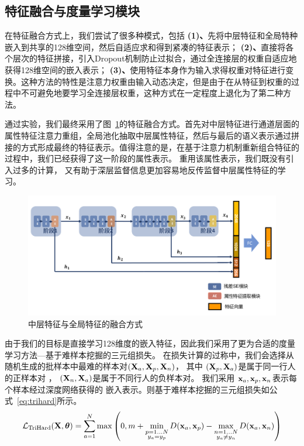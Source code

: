 
\subsection{特征融合与度量学习模块}

在特征融合方式上，我们尝试了很多种模式，包括
\textbf{(1)、}先将中层特征和全局特种嵌入到共享的128维空间，然后自适应求和得到紧凑的特征表示；
\textbf{(2)、}直接将各个层次的特征拼接，引入Dropout机制防止过拟合，通过全连接层的权重自适应地获得128维空间的嵌入表示；
\textbf{(3)、}使用特征本身作为输入求得权重对特征进行变换。这种方法的特性是注意力权重由输入动态决定，但是由于在从特征到权重的过程中不可避免地要学习全连接层权重，这种方式在一定程度上退化为了第二种方法。

通过实验，我们最终采用了图~\ref{fig:fusion}的特征融合方式。首先对中层特征进行通道层面的属性特征注意力重组，全局池化抽取中层属性特征，然后与最后的语义表示通过拼接的方式形成最终的特征表示。值得注意的是，在基于注意力机制重新组合特征的过程中，我们已经获得了这一阶段的属性表示。
重用该属性表示，我们既没有引入过多的计算，
又有助于深层监督信息更加容易地反传监督中层属性特征的学习。

\begin{figure}
	\centering
	\includegraphics[width=.9\textwidth]{fig/2018-05-11-16-54-07.png}
	\caption{中层特征与全局特征的融合方式}
	\label{fig:fusion}
\end{figure}

由于我们的目标是直接学习128维度的嵌入特征，因此我们采用了更为合适的度量学习方法---基于难样本挖掘的三元组损失\cite{hermans2017defense}。
在损失计算的过称中，我们会选择从随机生成的批样本中最难的样本对$({\mathbf{X}}_a, {\mathbf{X}}_p, {\mathbf{X}}_n)$，
其中 $({\mathbf{X}}_p, {\mathbf{X}}_a)$是属于同一行人的正样本对
， $({\mathbf{X}}_n, {\mathbf{X}}_a)$是属于不同行人的负样本对。
我们采用 ${\mathbf{x}}_a, {\mathbf{x}}_p, {\mathbf{x}}_n$表示每个样本经过深度网络获得的
嵌入表示。则基于难样本挖掘的三元组损失如公式~\ref{eq:trihard}所示。
\begin{equation}
	\mathcal{L}_{\textrm{TriHard}} ({\mathbf{X}}, {\boldsymbol{\theta}}) = \sum_{a=1}^{N} \max\left(
	0, m + \min_{\substack{
			p=1...N \\
			y_a = y_p}
	} D({\mathbf{x}}_a, {\mathbf{x}}_p)
	-  \max_{ \substack{
			n=1...N \\
			y_a \neq y_n }
	} D({\mathbf{x}}_a,{\mathbf{x}}_n)
	\right) \label{eq:trihard}
\end{equation}

